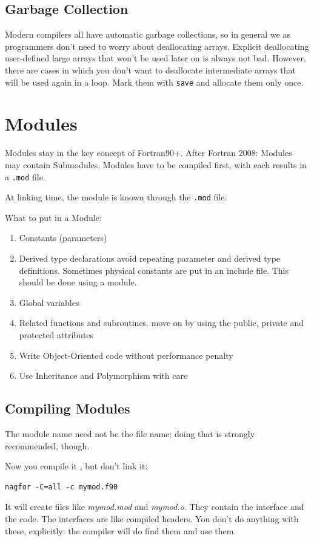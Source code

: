 \documentclass[11pt]{book} %
\begin{document}
\subsection{Garbage Collection}

Modern compilers all have automatic garbage collections, so in general we as programmers don't need to worry about deallocating arrays. Explicit deallocating user-defined large arrays that won't be used later on is always not bad. However, there are cases in which you don't want to deallocate intermediate arrays that will be used again in a loop. Mark them with \verb|save| and allocate them only once.


\section{Modules}

Modules stay in the key concept of Fortran90+. After Fortran 2008: Modules may contain Submodules.
Modules have to be compiled first, with each results in a \verb|.mod| file.

At linking time, the module is known through the \verb|.mod| file.

What to put in a Module:
\begin{enumerate}
\item Constants (parameters)
\item Derived type declarations
\subitem avoid repeating parameter and derived type definitions. Sometimes physical constants are put in an include file. This should be done using a module.
\item Global variables
\item Related functions and subroutines.
\subitem move on by using the public, private and protected attributes
\item Write Object-Oriented code without performance penalty
\item Use Inheritance and Polymorphism with care
\end{enumerate}


\subsection{Compiling Modules}

The module name need not be the file name; doing that is strongly recommended, though.

Now you compile it , but don't link it:
\begin{verbatim}
nagfor -C=all -c mymod.f90
\end{verbatim}
It will create files like \emph{mymod.mod} and \emph{mymod.o}. They contain the interface and the code. The interfaces are like compiled headers. You don’t do anything with these, explicitly: the compiler will do find them and use them.
\end{document}
